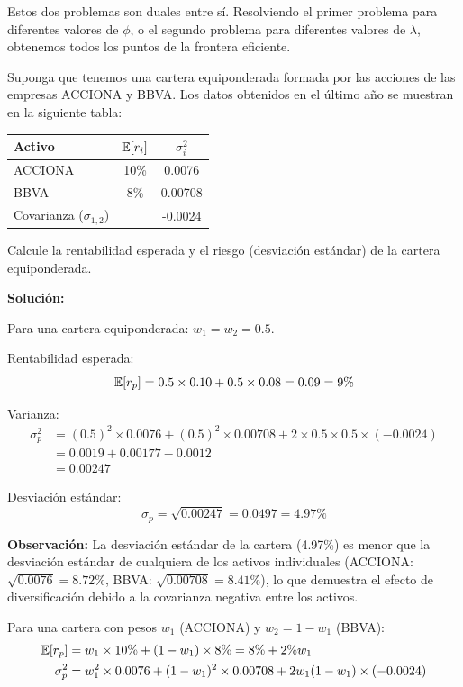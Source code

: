 Estos dos problemas son duales entre sí. Resolviendo el primer problema para diferentes valores de $\phi$, o el segundo problema para diferentes valores de $\lambda$, obtenemos todos los puntos de la frontera eficiente.

\begin{ejemplo}
Suponga que tenemos una cartera equiponderada formada por las acciones de las empresas ACCIONA y BBVA. Los datos obtenidos en el último año se muestran en la siguiente tabla:

\begin{center}
\begin{tabular}{lcc}
\toprule
Activo & $\mathbb{E}[r_i]$ & $\sigma_i^2$ \\
\midrule
ACCIONA & 10\% & 0.0076 \\
BBVA & 8\% & 0.00708 \\
Covarianza ($\sigma_{1,2}$) & & -0.0024 \\
\bottomrule
\end{tabular}
\end{center}

Calcule la rentabilidad esperada y el riesgo (desviación estándar) de la cartera equiponderada.

\textbf{Solución:}

Para una cartera equiponderada: $w_1 = w_2 = 0.5$.

Rentabilidad esperada:
$$\mathbb{E}[r_p] = 0.5 \times 0.10 + 0.5 \times 0.08 = 0.09 = 9\%$$

Varianza:
\begin{align*}
\sigma_p^2 &= (0.5)^2 \times 0.0076 + (0.5)^2 \times 0.00708 + 2 \times 0.5 \times 0.5 \times (-0.0024) \\
&= 0.0019 + 0.00177 - 0.0012 \\
&= 0.00247
\end{align*}

Desviación estándar:
$$\sigma_p = \sqrt{0.00247} = 0.0497 = 4.97\%$$

\textbf{Observación:} La desviación estándar de la cartera (4.97\%) es menor que la desviación estándar de cualquiera de los activos individuales (ACCIONA: $\sqrt{0.0076} = 8.72\%$, BBVA: $\sqrt{0.00708} = 8.41\%$), lo que demuestra el efecto de diversificación debido a la covarianza negativa entre los activos.

Para una cartera con pesos $w_1$ (ACCIONA) y $w_2 = 1-w_1$ (BBVA):
\begin{align*}
\mathbb{E}[r_p] &= w_1 \times 10\% + (1-w_1) \times 8\% = 8\% + 2\% w_1\\
\sigma_p^2 &= w_1^2 \times 0.0076 + (1-w_1)^2 \times 0.00708 + 2w_1(1-w_1) \times (-0.0024)
\end{align*}


\end{ejemplo}
